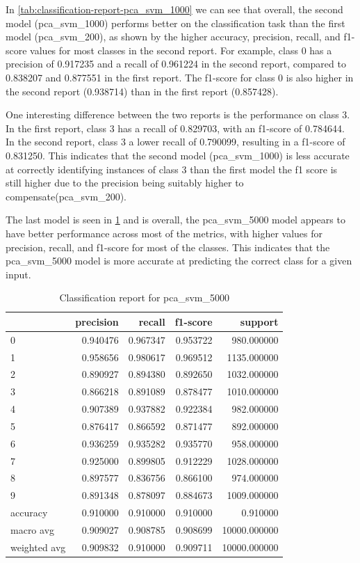 In \ref{tab:classification-report-pca_svm_1000} we can see that overall, the second model (pca_svm_1000) performs better on the classification task than the first model (pca_svm_200), as shown by the higher accuracy, precision, recall, and f1-score values for most classes in the second report. For example, class 0 has a precision of 0.917235 and a recall of 0.961224 in the second report, compared to 0.838207 and 0.877551 in the first report. The f1-score for class 0 is also higher in the second report (0.938714) than in the first report (0.857428).

One interesting difference between the two reports is the performance on class 3. In the first report, class 3 has a recall of 0.829703, with an f1-score of 0.784644. In the second report, class 3 a lower recall of 0.790099, resulting in a f1-score of 0.831250. This indicates that the second model (pca_svm_1000) is less accurate at correctly identifying instances of class 3 than the first model the f1 score is still higher due to the precision being suitably higher to compensate(pca_svm_200).

The last model is seen in \ref*{tab:classification-report-pca_svm_5000} and is overall, the pca_svm_5000 model appears to have better performance across most of the metrics, with higher values for precision, recall, and f1-score for most of the classes. This indicates that the pca_svm_5000 model is more accurate at predicting the correct class for a given input.

\begin{table}[htb!]
    \centering
    \caption{Classification report for pca_svm_5000}
    \label{tab:classification-report-pca_svm_5000}
    \begin{tabular}{lrrrr}
    \toprule
    & precision & recall & f1-score & support \\
    \midrule
    0 & 0.940476 & 0.967347 & 0.953722 & 980.000000 \\
    1 & 0.958656 & 0.980617 & 0.969512 & 1135.000000 \\
    2 & 0.890927 & 0.894380 & 0.892650 & 1032.000000 \\
    3 & 0.866218 & 0.891089 & 0.878477 & 1010.000000 \\
    4 & 0.907389 & 0.937882 & 0.922384 & 982.000000 \\
    5 & 0.876417 & 0.866592 & 0.871477 & 892.000000 \\
    6 & 0.936259 & 0.935282 & 0.935770 & 958.000000 \\
    7 & 0.925000 & 0.899805 & 0.912229 & 1028.000000 \\
    8 & 0.897577 & 0.836756 & 0.866100 & 974.000000 \\
    9 & 0.891348 & 0.878097 & 0.884673 & 1009.000000 \\
    accuracy & 0.910000 & 0.910000 & 0.910000 & 0.910000 \\
    macro avg & 0.909027 & 0.908785 & 0.908699 & 10000.000000 \\
    weighted avg & 0.909832 & 0.910000 & 0.909711 & 10000.000000 \\
    \bottomrule
    \end{tabular}
    \end{table}


